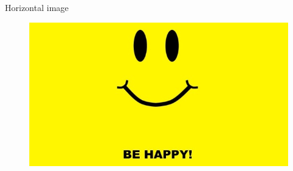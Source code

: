 \begin{frame}{Horizontal image}

\begin{figure}[htbp]
\centering
\includegraphics[width=\textwidth,height=0.8\textheight,keepaspectratio]{images/horizontal}
\end{figure}

\end{frame}

